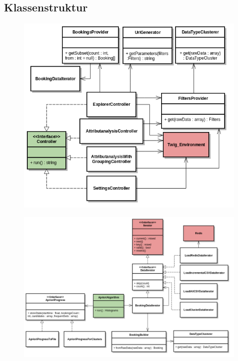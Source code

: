 \subsection{Klassenstruktur}
\label{sec:proofofconcept:klassenstruktur}
\begin{figure}[H]
	\centering
	\includegraphics[width=1\textwidth]{images/diagram-class-Controller}
	\caption{}
	\label{fig:proofofconcept:klassenstruktur:1}
\end{figure}
\begin{figure}
	\centering
	\includegraphics[width=1\textwidth]{images/diagram-class-AprioriAlgorithm}
	\caption{}
	\label{fig:proofofconcept:klassenstruktur:2}
\end{figure}
